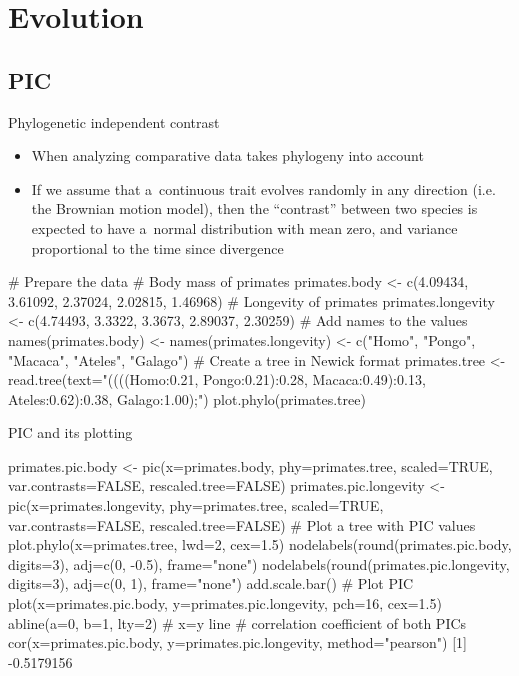 \documentclass[compress, ucs, xelatex, 11pt, xcolor=svgnames,
  hyperref={
    bookmarks=true,
    unicode=true,
    colorlinks=true,
    pdftitle={Molecular data in R},
    plainpages=false,
    pdfauthor={Vojtech Zeisek},
    pdfsubject={Course about phylogeny and evolution in R},
    pdfcreator={XeLaTeX},
    pdfkeywords={R, evolution, phylogeny, molecular data},
    linkcolor=Tomato,
    anchorcolor=SaddleBrown,
    citecolor=Goldenrod,
    filecolor=DarkMagenta,
    menucolor=Sienna,
    urlcolor=DarkTurquoise,
    pdftex},
  url={hyphens, lowtilde} %
  ]{beamer}
\begin{document}
\section{Evolution}

\subsection{PIC}

\begin{frame}[fragile]{Phylogenetic independent contrast}
\begin{itemize}
 \item When analyzing comparative data takes phylogeny into account
 \item If we assume that a~continuous trait evolves randomly in any direction (i.e. the Brownian motion model), then the ``contrast'' between two species is expected to have a~normal distribution with mean zero, and variance proportional to the time since divergence
\end{itemize}
  \begin{spluscode}
    # Prepare the data # Body mass of primates
    primates.body <- c(4.09434, 3.61092, 2.37024, 2.02815, 1.46968)
    # Longevity of primates
    primates.longevity <- c(4.74493, 3.3322, 3.3673, 2.89037, 2.30259)
    # Add names to the values
    names(primates.body) <- names(primates.longevity) <- c("Homo", "Pongo",
      "Macaca", "Ateles", "Galago")
    # Create a tree in Newick format
    primates.tree <- read.tree(text="((((Homo:0.21, Pongo:0.21):0.28,
      Macaca:0.49):0.13, Ateles:0.62):0.38, Galago:1.00);")
    plot.phylo(primates.tree)
  \end{spluscode}
\end{frame}

\begin{frame}[fragile]{PIC and its plotting}
  \begin{spluscode}
    primates.pic.body <- pic(x=primates.body, phy=primates.tree,
      scaled=TRUE, var.contrasts=FALSE, rescaled.tree=FALSE)
    primates.pic.longevity <- pic(x=primates.longevity, phy=primates.tree,
      scaled=TRUE, var.contrasts=FALSE, rescaled.tree=FALSE)
    # Plot a tree with PIC values
    plot.phylo(x=primates.tree, lwd=2, cex=1.5)
    nodelabels(round(primates.pic.body, digits=3), adj=c(0, -0.5),
      frame="none")
    nodelabels(round(primates.pic.longevity, digits=3), adj=c(0, 1),
      frame="none")
    add.scale.bar()
    # Plot PIC
    plot(x=primates.pic.body, y=primates.pic.longevity, pch=16, cex=1.5)
    abline(a=0, b=1, lty=2) # x=y line
    # correlation coefficient of both PICs
    cor(x=primates.pic.body, y=primates.pic.longevity, method="pearson")
    [1] -0.5179156
  \end{spluscode}
\end{frame}
\end{document}
